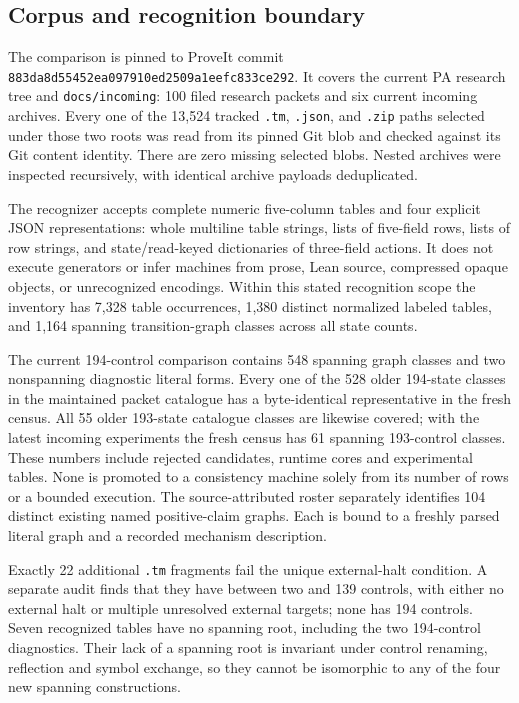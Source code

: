 \subsection{Corpus and recognition boundary}
The comparison is pinned to ProveIt commit
\texttt{883da8d55452ea097910ed2509a1eefc833ce292}.  It covers the current
PA research tree and \texttt{docs/incoming}: 100 filed research packets
and six current incoming archives.  Every one of the 13,524 tracked
\texttt{.tm}, \texttt{.json}, and \texttt{.zip} paths selected under those
two roots was read from its pinned Git blob and checked against its Git
content identity.  There are zero missing selected blobs.  Nested archives
were inspected recursively, with identical archive payloads deduplicated.

The recognizer accepts complete numeric five-column tables and four
explicit JSON representations: whole multiline table strings, lists of
five-field rows, lists of row strings, and state/read-keyed dictionaries
of three-field actions.  It does not execute generators or infer machines
from prose, Lean source, compressed opaque objects, or unrecognized
encodings.  Within this stated recognition scope the inventory has 7,328
table occurrences, 1,380 distinct normalized labeled tables, and 1,164
spanning transition-graph classes across all state counts.

The current 194-control comparison contains 548 spanning graph classes
and two nonspanning diagnostic literal forms.  Every one of the 528 older
194-state classes in the maintained packet catalogue has a byte-identical
representative in the fresh census.  All 55 older 193-state catalogue
classes are likewise covered; with the latest incoming experiments the
fresh census has 61 spanning 193-control classes.  These numbers include
rejected candidates, runtime cores and experimental tables.  None is
promoted to a consistency machine solely from its number of rows or a
bounded execution.  The source-attributed roster separately identifies
104 distinct existing named positive-claim graphs.  Each is bound to a
freshly parsed literal graph and a recorded mechanism description.

Exactly 22 additional \texttt{.tm} fragments fail the unique external-halt
condition.  A separate audit finds that they have between two and 139
controls, with either no external halt or multiple unresolved external
targets; none has 194 controls.  Seven recognized tables have no spanning
root, including the two 194-control diagnostics.  Their lack of a spanning
root is invariant under control renaming, reflection and symbol exchange,
so they cannot be isomorphic to any of the four new spanning constructions.

